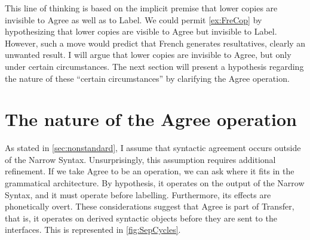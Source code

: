 \documentclass[MilwayThesis]{subfiles}
\begin{document}
This line of thinking is based on the implicit premise that lower copies are invisible to Agree as well as to Label.
We could permit \cref{ex:FreCop} by hypothesizing that lower copies are visible to Agree but invisible to Label.
However, such a move would predict that French generates resultatives, clearly an unwanted result.
I will argue that lower copies are invisible to Agree, but only under certain circumstances.
The next section will present a hypothesis regarding the nature of these ``certain circumstances'' by clarifying the Agree operation.

\section{The nature of the Agree operation}

As stated in \cref{sec:nonstandard}, I assume that syntactic agreement occurs outside of the Narrow Syntax.
Unsurprisingly, this assumption requires additional refinement.
If we take Agree to be an operation, we can ask where it fits in the grammatical architecture.
By hypothesis, it operates on the output of the Narrow Syntax, and it must operate before labelling.
Furthermore, its effects are phonetically overt.
These considerations suggest that Agree is part of Transfer, that is, it operates on derived syntactic objects before they are sent to the interfaces.
This is represented in \cref{fig:SepCycles}.
%
%
\end{document}
